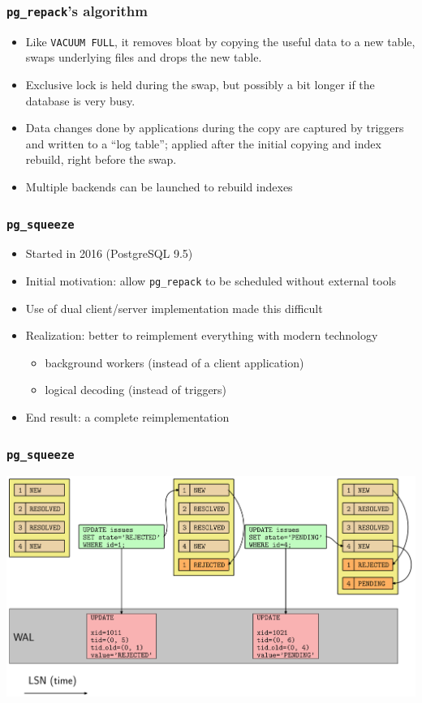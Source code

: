 \begin{frame}
  \frametitle{\texttt{pg\_repack}'s algorithm}
  \begin{itemize}
    \item Like \texttt{VACUUM FULL}, it removes bloat by copying the
      useful data to a new table, swaps underlying files and drops the new
      table.
    \item Exclusive lock is held during the swap, but possibly a bit longer if
      the database is very busy.
    \item Data changes done by applications during the copy are captured by
      triggers and written to a ``log table'';
      applied after the initial copying and index rebuild, right before the swap.
    \item Multiple backends can be launched to rebuild indexes
  \end{itemize}
\end{frame}

\begin{frame}
  \frametitle{\texttt{pg\_squeeze}}
  \begin{itemize}
    \item Started in 2016 (PostgreSQL 9.5)
    \item Initial motivation: allow \texttt{pg\_repack} to be scheduled without external tools
    \item Use of dual client/server implementation made this difficult
    \item Realization: better to reimplement everything with modern technology
      \begin{itemize}
	\item background workers (instead of a client application)
	\item logical decoding (instead of triggers)
      \end{itemize}
    \item End result: a complete reimplementation
  \end{itemize}
\end{frame}

\begin{frame}
  \frametitle{\texttt{pg\_squeeze}}
  \begin{center}
    \includegraphics[height=\sizeforimages\textheight]{images/pg_squeeze_01.png}
  \end{center}
\end{frame}

